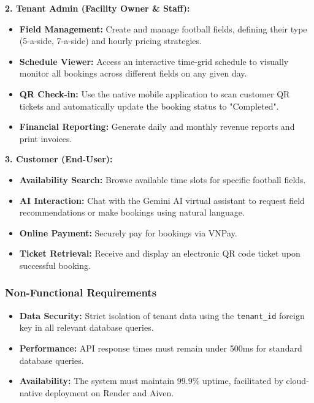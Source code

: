 \textbf{2. Tenant Admin (Facility Owner \& Staff):}
\begin{itemize}
    \item \textbf{Field Management:} Create and manage football fields, defining their type (5-a-side, 7-a-side) and hourly pricing strategies.
    \item \textbf{Schedule Viewer:} Access an interactive time-grid schedule to visually monitor all bookings across different fields on any given day.
    \item \textbf{QR Check-in:} Use the native mobile application to scan customer QR tickets and automatically update the booking status to "Completed".
    \item \textbf{Financial Reporting:} Generate daily and monthly revenue reports and print invoices.
\end{itemize}

\textbf{3. Customer (End-User):}
\begin{itemize}
    \item \textbf{Availability Search:} Browse available time slots for specific football fields.
    \item \textbf{AI Interaction:} Chat with the Gemini AI virtual assistant to request field recommendations or make bookings using natural language.
    \item \textbf{Online Payment:} Securely pay for bookings via VNPay.
    \item \textbf{Ticket Retrieval:} Receive and display an electronic QR code ticket upon successful booking.
\end{itemize}

\subsubsection{Non-Functional Requirements}
\begin{itemize}
    \item \textbf{Data Security:} Strict isolation of tenant data using the \texttt{tenant\_id} foreign key in all relevant database queries.
    \item \textbf{Performance:} API response times must remain under 500ms for standard database queries.
    \item \textbf{Availability:} The system must maintain 99.9\% uptime, facilitated by cloud-native deployment on Render and Aiven.
\end{itemize}

